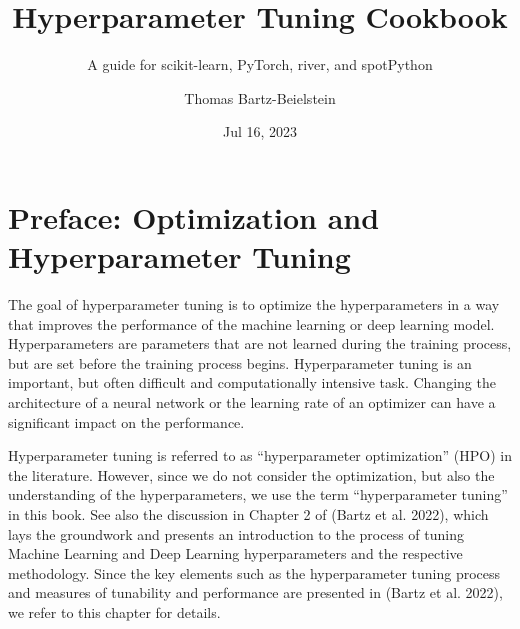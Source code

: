 \documentclass[
  letterpaper,
  DIV=11,
  numbers=noendperiod]{scrreprt}
\title{Hyperparameter Tuning Cookbook}
\subtitle{A guide for scikit-learn, PyTorch, river, and spotPython}
\author{Thomas Bartz-Beielstein}
\date{Jul 16, 2023}
\renewcommand*\contentsname{Table of contents}
\newcommand\contentsname{Table of contents}
\begin{document}
\maketitle
\ifdefined\Shaded\renewenvironment{Shaded}{\begin{tcolorbox}[boxrule=0pt, enhanced, sharp corners, frame hidden, borderline west={3pt}{0pt}{shadecolor}, interior hidden, breakable]}{\end{tcolorbox}}\fi

\renewcommand*\contentsname{Table of contents}
{
\hypersetup{linkcolor=}
\setcounter{tocdepth}{2}
\tableofcontents
}

\hypertarget{preface-optimization-and-hyperparameter-tuning}{%
\chapter*{Preface: Optimization and Hyperparameter
Tuning}\label{preface-optimization-and-hyperparameter-tuning}}


The goal of hyperparameter tuning is to optimize the hyperparameters in
a way that improves the performance of the machine learning or deep
learning model. Hyperparameters are parameters that are not learned
during the training process, but are set before the training process
begins. Hyperparameter tuning is an important, but often difficult and
computationally intensive task. Changing the architecture of a neural
network or the learning rate of an optimizer can have a significant
impact on the performance.

Hyperparameter tuning is referred to as ``hyperparameter optimization''
(HPO) in the literature. However, since we do not consider the
optimization, but also the understanding of the hyperparameters, we use
the term ``hyperparameter tuning'' in this book. See also the discussion
in Chapter 2 of (Bartz et al. 2022), which lays the groundwork and
presents an introduction to the process of tuning Machine Learning and
Deep Learning hyperparameters and the respective methodology. Since the
key elements such as the hyperparameter tuning process and measures of
tunability and performance are presented in (Bartz et al. 2022), we
refer to this chapter for details.
\end{document}
